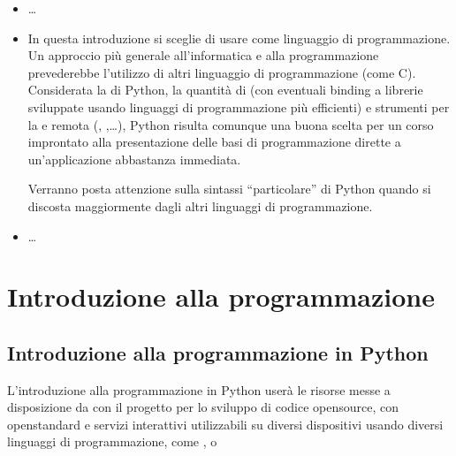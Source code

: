 \documentclass[letterpaper,10pt,english]{jupyterBook}
\begin{document}
\sphinxAtStartPar
{}
\begin{itemize}
\item {} 
\sphinxAtStartPar
{} …

\item {} 
\sphinxAtStartPar
{} In questa introduzione si sceglie di usare  come linguaggio di programmazione.
Un approccio più generale all’informatica e alla programmazione prevederebbe l’utilizzo di altri linguaggio di programmazione (come C).
Considerata la  di Python, la quantità di  (con eventuali binding a librerie sviluppate usando linguaggi di programmazione più efficienti) e strumenti per la  e remota (, ,…), Python risulta comunque una buona scelta per un corso improntato alla presentazione delle basi di programmazione dirette a un’applicazione abbastanza immediata.

\sphinxAtStartPar
Verranno posta attenzione sulla sintassi “particolare” di Python quando si discosta maggiormente dagli altri linguaggi di programmazione.

\item {} 
\sphinxAtStartPar
{} …

\end{itemize}

\sphinxstepscope


\part{Introduzione alla programmazione}

\sphinxstepscope


\chapter{Introduzione alla programmazione \sphinxhyphen{} in Python}
\label{\detokenize{ch/programming:introduzione-alla-programmazione-in-python}}\label{\detokenize{ch/programming:book-programming-intro-hs}}\label{\detokenize{ch/programming::doc}}
\sphinxAtStartPar
L’introduzione alla programmazione in Python userà le risorse messe a disposizione da  con il progetto  per lo sviluppo di codice open\sphinxhyphen{}source, con open\sphinxhyphen{}standard e servizi interattivi utilizzabili su diversi dispositivi usando diversi linguaggi di programmazione, come ,  o 
\end{document}
